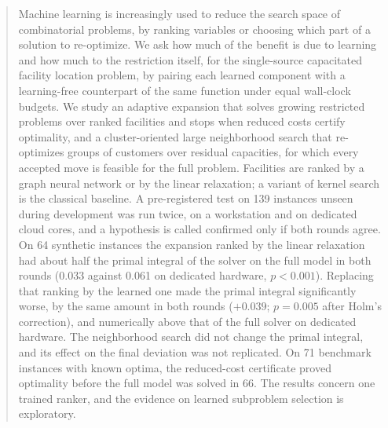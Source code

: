 \begin{abstract}
Machine learning is increasingly used to reduce the search space of combinatorial problems, by
ranking variables or choosing which part of a solution to re-optimize. We ask how much of the
benefit is due to learning and how much to the restriction itself, for the single-source
capacitated facility location problem, by pairing each learned component with a learning-free
counterpart of the same function under equal wall-clock budgets. We study an adaptive expansion
that solves growing restricted problems over ranked facilities and stops when reduced costs
certify optimality, and a cluster-oriented large neighborhood search that re-optimizes groups of
customers over residual capacities, for which every accepted move is feasible for the full
problem. Facilities are ranked by a graph neural network or by the linear relaxation; a variant
of kernel search is the classical baseline. A pre-registered test on 139 instances unseen
during development was run twice, on a workstation and on dedicated cloud cores, and a hypothesis
is called confirmed only if both rounds agree. On 64 synthetic instances the expansion ranked by
the linear relaxation had about half the primal integral of the solver on the full model in both
rounds (0.033 against 0.061 on dedicated hardware, $p<0.001$). Replacing that ranking by the
learned one made the primal integral significantly worse, by the same amount in both rounds
($+0.039$; $p=0.005$ after Holm's correction), and numerically above that of the full solver on dedicated
hardware. The neighborhood search did not change the primal integral, and its effect on the final
deviation was not replicated. On 71 benchmark instances with known optima, the reduced-cost
certificate proved optimality before the full model was solved in 66. The results concern one
trained ranker, and the evidence on learned subproblem selection is exploratory.
\end{abstract}
